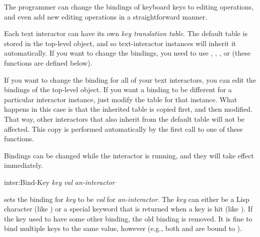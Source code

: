 The programmer can change the bindings of keyboard keys to editing
operations, and even add new editing operations in a straightforward
manner.

Each text interactor can have its own {\it key translation table}.  The default
table is stored in the top-level  object, and so
text-interactor instances will inherit it automatically.  If you want to
change the bindings, you need to use , ,
, or  (these functions
are defined below).

If you want to change the binding for all of your text interactors, you can
edit the bindings of the top-level  object.  If you
want a binding to be different for a particular interactor instance, just
modify the table for that instance.  What happens in this case is that the
inherited table is copied first, and then modified.  That way, other
interactors that also inherit from the default table will not be affected.
This copy is performed automatically by the first call to one of these
functions.

Bindings can be changed while the interactor is running, and they will take
effect immediately.

\begin{programexample}
inter:Bind-Key {\it key} {\it val} {\it an-interactor}\value{function}
\end{programexample}
 sets the binding for {\it key} to be {\it val} for
{\it an-interactor}.   The {\it key} can either be a Lisp character (like
) or a special keyword
that is returned when a key is hit (like ).   If the key used
to have some other binding, the old binding is removed.  It is fine to bind
multiple keys to the same value, however (e.g., both  and
 are bound to ).

